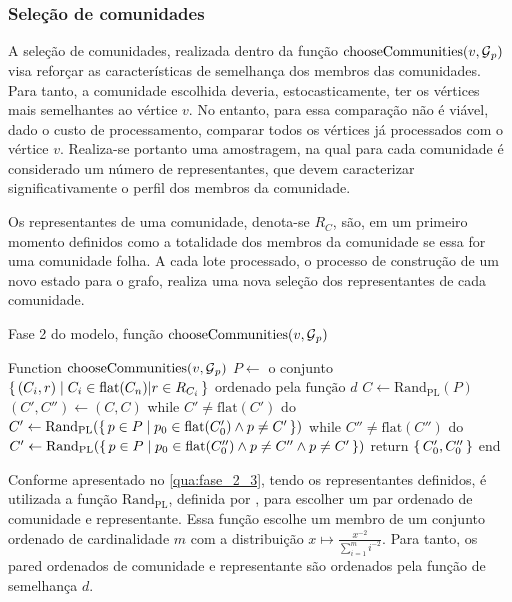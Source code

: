 \documentclass[notes.tex]{subfiles}
\begin{document}
\subsubsection{Seleção de comunidades}

A seleção de comunidades, realizada dentro da função $\text{chooseCommunities}(v, \operatorname{\mathcal{G}}_p)$ visa reforçar as características de semelhança dos membros das comunidades.
Para tanto, a comunidade escolhida deveria, estocasticamente, ter os vértices mais semelhantes ao vértice $v$.
No entanto, para essa comparação não é viável, dado o custo de processamento, comparar todos os vértices já processados com o vértice $v$.
Realiza-se portanto uma amostragem, na qual para cada comunidade é considerado um número de representantes, que devem caracterizar significativamente o perfil dos membros da comunidade.

Os representantes de uma comunidade, denota-se $R_C$, são, em um primeiro momento definidos como a totalidade dos membros da comunidade se essa for uma comunidade folha.
A cada lote processado, o processo de construção de um novo estado para o grafo, realiza uma nova seleção dos representantes de cada comunidade.

\begin{quadro}[htbp]
\caption{Fase 2 do modelo, função $\text{chooseCommunities}(v, \operatorname{\mathcal{G}}_p)$}
\label{qua:fase_2_3}
\begin{algorithm}
Function $\text{chooseCommunities}(v, \operatorname{\mathcal{G}}_p)$
    $P \leftarrow $ o conjunto $\set{(C_i, r) | C_i \in \text{flat}(C_n) | r \in R_{C_i}}$ ordenado pela  $\text{função } d$
    $C \leftarrow \text{Rand}_{\text{PL}}(P)$
    $(C', C'') \leftarrow (C, C)$
    while $C' \neq \text{flat}(C')$ do $C' \leftarrow \text{Rand}_\text{PL}(\set{p \in P | p_0 \in \text{flat}(C'_0) \land p \neq C'})$
    while $C'' \neq \text{flat}(C'')$ do $C' \leftarrow \text{Rand}_\text{PL}(\set{p \in P | p_0 \in \text{flat}(C''_0) \land p \neq C'' \land p \neq C'})$
    return $\set{C'_0, C''_0}$
end
\end{algorithm}
\end{quadro}

Conforme apresentado no \autoref{qua:fase_2_3}, tendo os representantes definidos, é utilizada a função $\text{Rand}_\text{PL}$, definida por , para escolher um par ordenado de comunidade e representante.
Essa função escolhe um membro de um conjunto ordenado de cardinalidade $m$ com a distribuição $x \mapsto \frac{x^{-2}}{\sum^m_{i=1}i^{-2}}$.
Para tanto, os pared ordenados de comunidade e representante são ordenados pela função de semelhança $d$.
\end{document}
